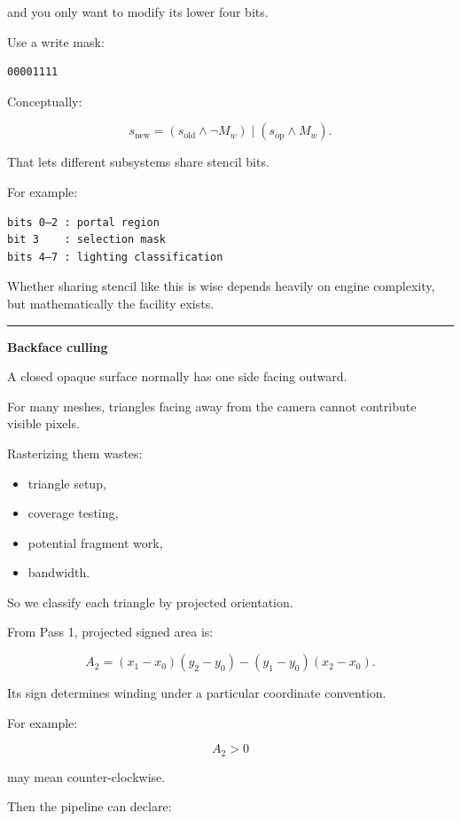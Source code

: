 and you only want to modify its lower four bits.

Use a write mask:

\begin{verbatim}
00001111
\end{verbatim}

Conceptually:

\[
s_{\text{new}}
=
(s_{\text{old}}\land\neg M_w)
\;|\;
(s_{\text{op}}\land M_w).
\]

That lets different subsystems share stencil bits.

For example:

\begin{verbatim}
bits 0–2 : portal region
bit 3    : selection mask
bits 4–7 : lighting classification
\end{verbatim}

Whether sharing stencil like this is wise depends heavily on engine complexity, but mathematically the facility exists.

\begin{center}\rule{0.5\linewidth}{0.5pt}\end{center}

\textbf{Backface culling}

A closed opaque surface normally has one side facing outward.

For many meshes, triangles facing away from the camera cannot contribute visible pixels.

Rasterizing them wastes:

\begin{itemize}
\tightlist
\item
  triangle setup,
\item
  coverage testing,
\item
  potential fragment work,
\item
  bandwidth.
\end{itemize}

So we classify each triangle by projected orientation.

From Pass 1, projected signed area is:

\[
A_2 =
(x_1-x_0)(y_2-y_0)
-
(y_1-y_0)(x_2-x_0).
\]

Its sign determines winding under a particular coordinate convention.

For example:

\[
A_2>0
\]

may mean counter-clockwise.

Then the pipeline can declare:

